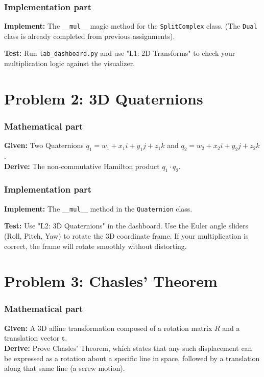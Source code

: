 \documentclass[11pt]{article}
\begin{document}
\subsubsection*{Implementation part}
\textbf{Implement:} The \lstinline|__mul__| magic method for the \lstinline|SplitComplex| class. (The \lstinline|Dual| class is already completed from previous assignments).

\textbf{Test:} Run \lstinline|lab_dashboard.py| and use "L1: 2D Transforms" to check your multiplication logic against the visualizer.

\section*{Problem 2: 3D Quaternions}

\subsubsection*{Mathematical part}
\textbf{Given:} Two Quaternions $q_1 = w_1 + x_1i + y_1j + z_1k$ and $q_2 = w_2 + x_2i + y_2j + z_2k$. \\
\textbf{Derive:} The non-commutative Hamilton product $q_1 \cdot q_2$.

\subsubsection*{Implementation part}
\textbf{Implement:} The \lstinline|__mul__| method in the \lstinline|Quaternion| class.

\textbf{Test:} Use "L2: 3D Quaternions" in the dashboard. Use the Euler angle sliders (Roll, Pitch, Yaw) to rotate the 3D coordinate frame. If your multiplication is correct, the frame will rotate smoothly without distorting.

\section*{Problem 3: Chasles' Theorem}

\subsubsection*{Mathematical part}
\textbf{Given:} A 3D affine transformation composed of a rotation matrix $R$ and a translation vector $\mathbf{t}$. \\
\textbf{Derive:} Prove Chasles' Theorem, which states that any such displacement can be expressed as a rotation about a specific line in space, followed by a translation along that same line (a screw motion). 
\end{document}

